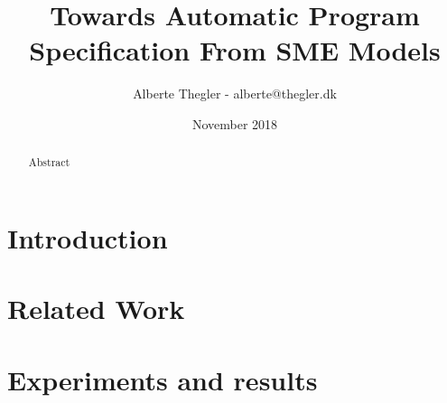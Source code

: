\documentclass[a4paper]{report}
\title{Towards Automatic Program Specification From SME Models}
\author{Alberte Thegler - alberte@thegler.dk}
\date{November 2018}
\begin{document}
\maketitle

\begin{abstract}
\begin{doublespace}
Abstract

\end{doublespace}
\end{abstract}



\newpage
\tableofcontents
%
%
\newpage
{}


% 
% 
% 
% 
% 
% 
% 
% 

\chapter{Introduction}


%

\chapter{Related Work}
\label{chap:related-work}


% 

% 

\chapter{Experiments and results}
\label{chap:exp}

\end{document}
